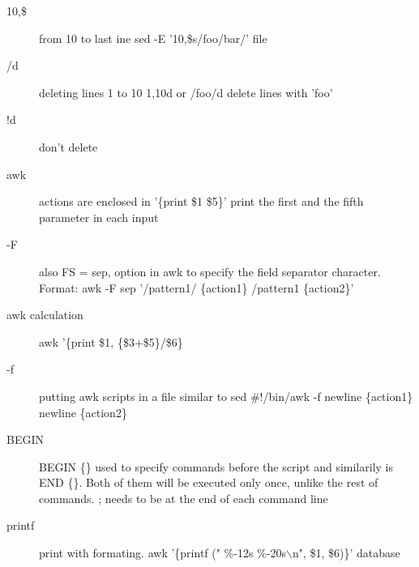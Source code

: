 \documentclass[12pt,a4paper]{report}
\begin{document}
\begin{description}
\item[10,\$] from 10 to last ine  sed -E '10,\$s/foo/bar/' file  \\
\item[/d] deleting lines 1 to 10 1,10d or /foo/d delete lines with 'foo'  \\
\item[!d] don't delete  \\
\item[awk] actions are enclosed in '\{print \$1 \$5\}' print the first and the fifth parameter in each input  \\
\item[-F] also FS = sep, option in awk to specify the field separator character. Format: awk -F sep '/pattern1/ \{action1\} /pattern1 \{action2\}'  \\
\item[awk calculation] awk '\{print \$1, \{\$3+\$5\}/\$6\}  \\
\item[-f] putting awk scripts in a file similar to sed \#!/bin/awk -f newline \{action1\} newline \{action2\}  \\
\item[BEGIN] BEGIN \{\} used to specify commands before the script and similarily is END \{\}. Both of them will be executed only once, unlike the rest of commands. ; needs to be at the end of each command line \\
\item[printf] print with formating. awk '\{printf (" \%-12s \%-20s$\backslash$n", \$1, \$6)\}' database
\end{description}


\vspace{40pt}
\end{document}
